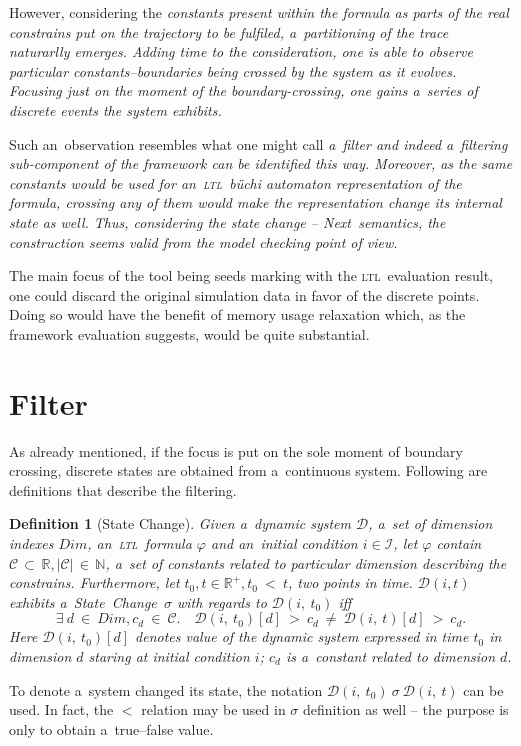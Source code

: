 \documentclass[11pt]{fithesis}
\newcommand{\ltl}{\textsc{ltl}~}
\newcommand{\Next}{\emph{Next}~}
\newcommand{\mD}{\mathcal{D}}
\newcommand{\mC}{\mathcal{C}}
\newcommand{\mI}{\mathcal{I}}
\newcommand{\mReal}{\mathbb{R}}
\newcommand{\mNatural}{\mathbb{N}}
\newtheorem{mydef}{Definition}
\begin{document}
However, considering the \em constants \rm present within the formula as parts of the real \em constrains \rm put on the 
trajectory to be fulfiled, a~partitioning of the trace naturarlly emerges. Adding time to the consideration, one is able to
observe particular constants--boundaries being crossed by the system as it evolves. \em Focusing just on the moment of
the boundary-crossing, one gains a~series of discrete events the system exhibits\rm{}.

Such an~observation resembles what one might call \em a~filter \rm and indeed a~filtering sub-component of the framework
can be identified this way. Moreover, as the same constants would be used for an~\ltl b\"{u}chi automaton representation of the formula, 
crossing any of them would make the representation change its internal state as well.
Thus, considering the state change -- \Next semantics, the construction seems valid from the model checking point of view.

The main focus of the tool being seeds marking with the \ltl evaluation result, one could discard the original simulation
data in favor of the discrete points.
Doing so would have the benefit of memory usage relaxation which, as the framework evaluation suggests, would be quite substantial.

\section{Filter}
As already mentioned, if the focus is put on the sole moment of boundary
crossing, discrete states are obtained from a~continuous system.
Following are definitions that describe the filtering.
\begin{mydef}[State Change]
Given a~dynamic system $\mD$, a~set of dimension indexes $Dim$, an~\ltl formula $\varphi$ and an~initial
condition $i \in \mI$, let $\varphi$ contain
$\mC\,\subset\,\mReal, |\mC|\,\in\,\mNatural$, a~set of constants related to
particular dimension describing the constrains. Furthermore, let
$t_0, t \in \mReal^{+}, t_0~<~t$, two points in time.
$\mD(i, t)$ exhibits a~State~Change~$\sigma$ with regards to $\mD(i,~t_0)$ iff
$$\exists~d~\in~Dim, c_d~\in~\mC.\quad \mD(i,~t_0)[d]~>~c_d~\neq~\mD(i,~t)[d]~>~c_d.$$
Here $\mD(i,~t_0)[d]$ denotes value of the dynamic system expressed in time
$t_0$ in dimension $d$ staring at initial condition $i$; $c_d$
is a~constant related to dimension $d$.
\end{mydef}
To denote a~system changed its state, the notation
$\mD(i,~t_0)~\sigma~\mD(i,~t)$ can be used.
In fact, the $<$ relation may be used in $\sigma$ definition as well --
the purpose is only to obtain a~true--false value.
 
%

%
%
\end{document}
